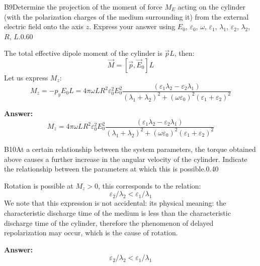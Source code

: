 \documentclass[11pt,a4paper]{article}
\begin{document}
\begin{solcard}{B9}{Determine the projection of the moment of force $M_{E}$ acting on the cylinder (with the polarization charges of the medium surrounding it) from the external electric field onto the axis $z$. Express your answer using $E_0$, $\varepsilon_0$, $\omega$, $\varepsilon_1$, $\lambda_1$, $\varepsilon_2$, $\lambda_2$, $R$, $L$.}{0.60}

The total effective dipole moment of the cylinder is $\vec pL$, then: \[\vec M=[\vec p,\vec E_0]L\] Let us express $M_z$: \[M_z=-p_yE_0L=4\pi\omega LR^2\varepsilon_0^2E_0^2\dfrac{(\varepsilon_1\lambda_2-\varepsilon_2\lambda_1) }{(\lambda_1 + \lambda_2)^2 + (\omega \varepsilon_0)^2 (\varepsilon_1 + \varepsilon_2)^2}\]

\par\smallskip\noindent\textbf{Answer:} \[M_z=4\pi\omega LR^2\varepsilon_0^2E_0^2\dfrac{(\varepsilon_1\lambda_2-\varepsilon_2\lambda_1) }{(\lambda_1 + \lambda_2)^2 + (\omega \varepsilon_0)^2 (\varepsilon_1 + \varepsilon_2)^2}\]
\end{solcard}

\begin{solcard}{B10}{At a certain relationship between the system parameters, the torque obtained above causes a further increase in the angular velocity of the cylinder. Indicate the relationship between the parameters at which this is possible.}{0.40}

Rotation is possible at $M_z>0$, this corresponds to the relation: \[\varepsilon_2/\lambda_2<\varepsilon_1/\lambda_1\]We note that this expression is not accidental: its physical meaning: the characteristic discharge time of the medium is less than the characteristic discharge time of the cylinder, therefore the phenomenon of delayed repolarization may occur, which is the cause of rotation.

\par\smallskip\noindent\textbf{Answer:} \[\varepsilon_2/\lambda_2<\varepsilon_1/\lambda_1\]
\end{solcard}
\end{document}
